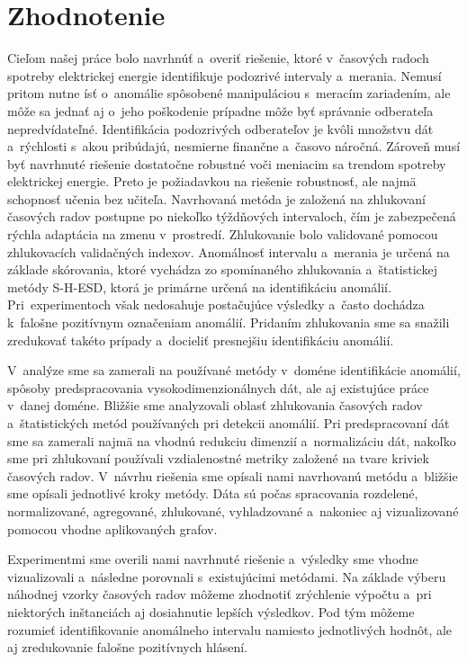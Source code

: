 \documentclass[a4paper,twoside,slovak,12pt,appendix]{article}
\begin{document}
\section{Zhodnotenie}
\label{c:evaluation}
Cieľom našej práce bolo navrhnúť a~overiť riešenie, ktoré v~časových radoch
spotreby elektrickej energie identifikuje podozrivé intervaly a~merania. Nemusí
pritom nutne ísť o~anomálie spôsobené manipuláciou s~meracím zariadením, ale
môže sa jednať aj o~jeho poškodenie prípadne môže byť správanie odberateľa
nepredvídateľné. Identifikácia podozrivých odberateľov je kvôli množstvu dát
a~rýchlosti s~akou pribúdajú, nesmierne finančne a~časovo náročná. Zároveň musí
byť navrhnuté riešenie dostatočne robustné voči meniacim sa trendom spotreby
elektrickej energie. Preto je požiadavkou na riešenie robustnosť, ale najmä
schopnosť učenia bez učiteľa. Navrhovaná metóda je založená na zhlukovaní
časových radov postupne po niekoľko týždňových intervaloch, čím je zabezpečená
rýchla adaptácia na zmenu v~prostredí. Zhlukovanie bolo validované pomocou
zhlukovacích validačných indexov. Anomálnosť intervalu a~merania je určená na
základe skórovania, ktoré vychádza zo spomínaného zhlukovania a~štatistickej
metódy S-H-ESD, ktorá je primárne určená na identifikáciu anomálií.
Pri~experimentoch však nedosahuje postačujúce výsledky a~často dochádza
k~falošne pozitívnym označeniam anomálií. Pridaním zhlukovania sme sa snažili
zredukovať takéto prípady a~docieliť presnejšiu identifikáciu anomálií.

V~analýze sme sa zamerali na používané metódy v~doméne identifikácie anomálií,
spôsoby predspracovania vysokodimenzionálnych dát, ale aj existujúce práce
v~danej doméne. Bližšie sme analyzovali oblasť zhlukovania časových radov
a~štatistických metód používaných pri detekcii anomálií. Pri predspracovaní dát
sme sa zamerali najmä na vhodnú redukciu dimenzií a~normalizáciu dát, nakoľko
sme pri zhlukovaní používali vzdialenostné metriky založené na tvare kriviek
časových radov. V~návrhu riešenia sme opísali nami navrhovanú metódu a~bližšie
sme opísali jednotlivé kroky metódy. Dáta sú počas spracovania rozdelené,
normalizované, agregované, zhlukované, vyhladzované a~nakoniec aj vizualizované
pomocou vhodne aplikovaných grafov.

Experimentmi sme overili nami navrhnuté riešenie a~výsledky sme vhodne
vizualizovali a~následne porovnali s~existujúcimi metódami. Na základe výberu
náhodnej vzorky časových radov môžeme zhodnotiť zrýchlenie výpočtu a~pri
niektorých inštanciách aj dosiahnutie lepších výsledkov. Pod tým môžeme
rozumieť identifikovanie anomálneho intervalu namiesto jednotlivých hodnôt, ale
aj zredukovanie falošne pozitívnych hlásení.
\end{document}
